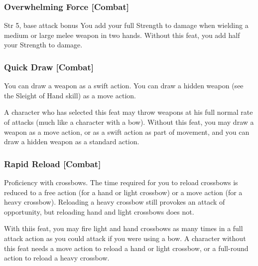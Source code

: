 \subsubsection{Overwhelming Force [Combat]}
 Str 5, base attack bonus 
 You add your full Strength to damage when wielding a medium or large melee weapon in two hands.
 Without this feat, you add half your Strength to damage.

\subsubsection{Quick Draw [Combat]}
 You can draw a weapon as a swift action. You can draw a hidden weapon (see the Sleight of Hand skill) as a move action.
\par A character who has selected this feat may throw weapons at his full normal rate of attacks (much like a character with a bow).
 Without this feat, you may draw a weapon as a move action, or as a swift action as part of movement, and you can draw a hidden weapon as a standard action.

\subsubsection{Rapid Reload [Combat]}
 Proficiency with crossbows.
 The time required for you to reload crossbows is reduced to a free action (for a hand or light crossbow) or a move action (for a heavy crossbow). Reloading a heavy crossbow still provokes an attack of opportunity, but reloading hand and light crossbows does not.
\par With thiis feat, you may fire light and hand crossbows as many times in a full attack action as you could attack if you were using a bow.
 A character without this feat needs a move action to reload a hand or light crossbow, or a full-round action to reload a heavy crossbow.



